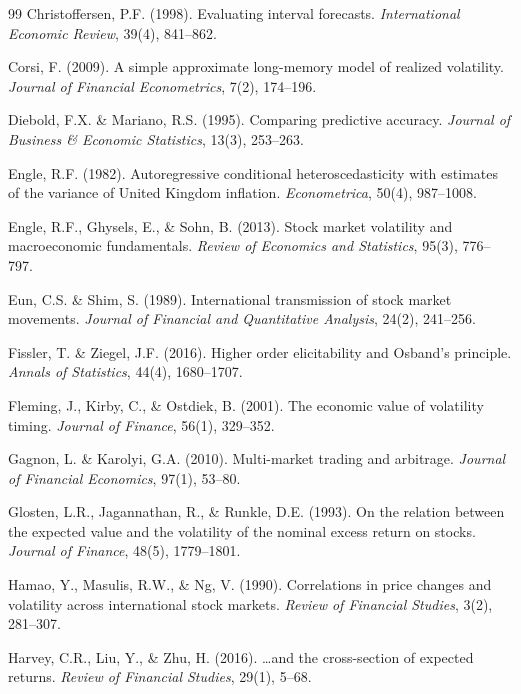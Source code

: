 \documentclass[12pt,a4paper]{article}
\begin{document}
\begin{thebibliography}{99}
Christoffersen, P.F. (1998). Evaluating interval forecasts. \textit{International Economic Review}, 39(4), 841--862.

Corsi, F. (2009). A simple approximate long-memory model of realized volatility. \textit{Journal of Financial Econometrics}, 7(2), 174--196.

Diebold, F.X. \& Mariano, R.S. (1995). Comparing predictive accuracy. \textit{Journal of Business \& Economic Statistics}, 13(3), 253--263.

Engle, R.F. (1982). Autoregressive conditional heteroscedasticity with estimates of the variance of United Kingdom inflation. \textit{Econometrica}, 50(4), 987--1008.

Engle, R.F., Ghysels, E., \& Sohn, B. (2013). Stock market volatility and macroeconomic fundamentals. \textit{Review of Economics and Statistics}, 95(3), 776--797.

Eun, C.S. \& Shim, S. (1989). International transmission of stock market movements. \textit{Journal of Financial and Quantitative Analysis}, 24(2), 241--256.

Fissler, T. \& Ziegel, J.F. (2016). Higher order elicitability and Osband's principle. \textit{Annals of Statistics}, 44(4), 1680--1707.

Fleming, J., Kirby, C., \& Ostdiek, B. (2001). The economic value of volatility timing. \textit{Journal of Finance}, 56(1), 329--352.

Gagnon, L. \& Karolyi, G.A. (2010). Multi-market trading and arbitrage. \textit{Journal of Financial Economics}, 97(1), 53--80.

Glosten, L.R., Jagannathan, R., \& Runkle, D.E. (1993). On the relation between the expected value and the volatility of the nominal excess return on stocks. \textit{Journal of Finance}, 48(5), 1779--1801.

Hamao, Y., Masulis, R.W., \& Ng, V. (1990). Correlations in price changes and volatility across international stock markets. \textit{Review of Financial Studies}, 3(2), 281--307.

Harvey, C.R., Liu, Y., \& Zhu, H. (2016). \ldots and the cross-section of expected returns. \textit{Review of Financial Studies}, 29(1), 5--68.


\end{thebibliography}
\end{document}
